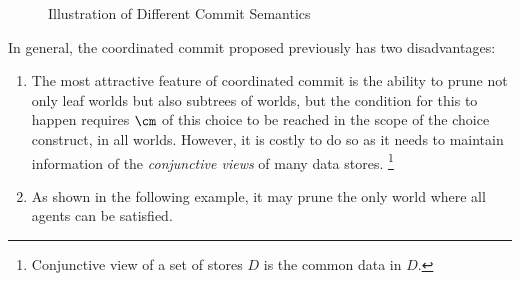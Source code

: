\begin{figure}
{\begin{minipage}{0.21\textwidth}
\end{minipage}
}
\caption{Illustration of Different Commit Semantics}
\label{fig:cmcmp}
\end{figure}

In general, the coordinated commit proposed previously \cite{JaffarYZ07}
has two disadvantages:
\begin{enumerate}
  \item The most attractive feature of coordinated commit is the ability to
  prune not only leaf worlds but also subtrees of worlds,
  but the condition for this to happen requires $\cm$ of this choice to be reached
  in the scope of the choice construct, in all worlds.
  However, it is costly to do so as it needs to maintain information
	of the {\em conjunctive views} of many data stores. \footnote{Conjunctive view
of a set of stores $D$ is the common data in $D$.}
  \item As shown in the following example, it may prune the only world
	where all agents can be satisfied.
\end{enumerate}

